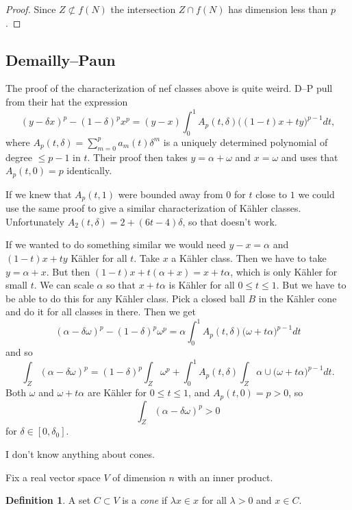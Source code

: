 \documentclass[11pt]{amsart}
\theoremstyle{definition}
\newtheorem{defi}[theo]{Definition}
\begin{document}
\begin{proof}
Since $Z \not\subset f(N)$ the intersection $Z \cap f(N)$ has dimension less than $p$.
\end{proof}




\subsection*{Demailly--Paun}

The proof of the characterization of nef classes above is quite weird.
D--P pull from their hat the expression
\[
(y - \delta x)^p - (1-\delta)^p x^p
= (y-x) \int_0^1 A_p(t, \delta) \bigl( (1-t)x + ty \bigr)^{p-1} dt,
\]
where $A_p(t,\delta) = \sum_{m=0}^p a_m(t) \delta^m$ is a uniquely determined polynomial of degree $\leq p-1$ in $t$.
Their proof then takes $y = \alpha + \omega$ and $x = \omega$ and uses that $A_p(t,0) = p$ identically.

If we knew that $A_p(t,1)$ were bounded away from $0$ for $t$ close to $1$ we could use the same proof to give a similar characterization of K\"ahler classes.
Unfortunately $A_2(t,\delta) = 2 + (6t - 4)\delta$, so that doesn't work.

If we wanted to do something similar we would need $y - x = \alpha$ and $(1-t)x + ty$ K\"ahler for all $t$.
Take $x$ a K\"ahler class.
Then we have to take $y = \alpha + x$.
But then $(1-t)x + t(\alpha + x) = x + t\alpha$, which is only K\"ahler for small $t$.
We can scale $\alpha$ so that $x + t\alpha$ is K\"ahler for all $0 \leq t \leq 1$.
But we have to be able to do this for any K\"ahler class.
Pick a closed ball $B$ in the K\"ahler cone and do it for all classes in there.
Then we get
\[
(\alpha - \delta\omega)^p - (1-\delta)^p\omega^p
= \alpha \int_0^1 A_p(t,\delta)\bigl(\omega + t \alpha\bigr)^{p-1} dt
\]
and so
\[
\int_Z (\alpha - \delta\omega)^p
= (1-\delta)^p \int_Z \omega^p
+ \int_0^1 A_p(t,\delta) \int_Z \alpha \cup \bigl(\omega + t \alpha\bigr)^{p-1} dt.
\]
Both $\omega$ and $\omega + t\alpha$ are K\"ahler for $0 \leq t \leq 1$, and $A_p(t,0) = p > 0$, so
\[
\int_Z (\alpha - \delta\omega)^p > 0
\]
for $\delta \in [0, \delta_0]$.


I don't know anything about cones.

Fix a real vector space $V$ of dimension $n$ with an inner product.

\begin{defi}
A set $C \subset V$ is a \emph{cone} if $\lambda x \in x$ for all $\lambda > 0$ and $x \in C$.
\end{defi}
\end{document}
